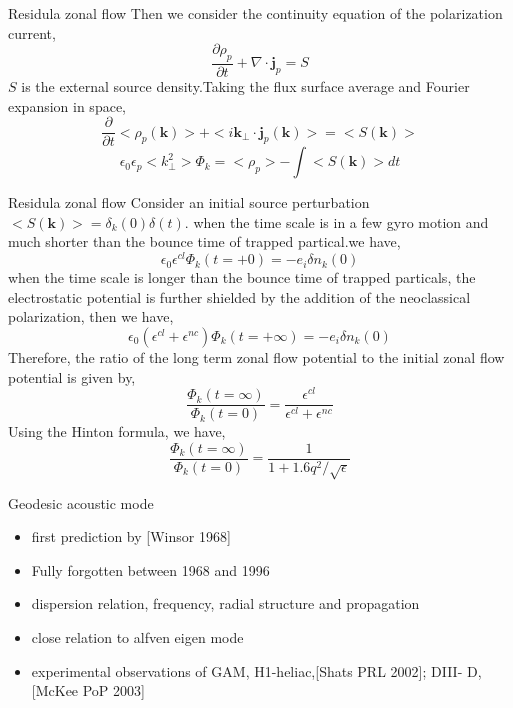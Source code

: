 \documentclass{beamer}
\begin{document}
\begin{frame}{Residula zonal flow}
Then we consider the continuity equation of the polarization current,
\begin{equation}
\frac{\partial\rho_p}{\partial{t}}+\nabla\cdot\pmb{j}_p=S		
\end{equation}
$S$ is the external source density.Taking the flux surface average and Fourier expansion in space, 
\begin{equation}
\frac{\partial}{\partial{t}}<\rho_p(\pmb{k})>+<i\pmb{k}_\perp\cdot{\pmb{j}_p}(\pmb{k})>=<S(\pmb{k})>
\end{equation}
\begin{equation}
\epsilon_0\epsilon_p<k_\perp^2>\Phi_k=<\rho_p>-\int<S(\pmb{k})>dt
\end{equation}
\end{frame}


\begin{frame}{Residula zonal flow}
Consider an initial source perturbation $<S(\pmb{k})>=\delta_k(0)\delta(t)$. when the time scale is in a few gyro motion and much shorter than the bounce time of trapped partical.we have,
\begin{equation}
\epsilon_0\epsilon^{cl}\Phi_k(t=+0)=-e_i\delta{n_k(0)}
\end{equation} 
when the time scale is longer than the bounce time of trapped particals, the electrostatic potential is further shielded by the addition of the neoclassical polarization, then we have,
\begin{equation}
\epsilon_0(\epsilon^{cl}+\epsilon^{nc})\Phi_k(t=+\infty)=-e_i\delta{n_k(0)}
\end{equation}
Therefore, the ratio of the long term zonal flow potential to the initial zonal flow potential is given by, 
\begin{equation}
\frac{\Phi_k(t=\infty)}{\Phi_k(t=0)}=\frac{\epsilon^{cl}}{\epsilon^{cl}+\epsilon^{nc}}
\end{equation}
Using the Hinton formula, we have,
\begin{equation}
\frac{\Phi_k(t=\infty)}{\Phi_k(t=0)}=\frac{1}{1+1.6q^2/\sqrt{\epsilon}}
\end{equation}
\end{frame}


\begin{frame}{Geodesic acoustic mode}
\begin{itemize}
\item first prediction by [Winsor 1968]
\item Fully forgotten between 1968 and 1996
\item dispersion relation, frequency, radial structure and propagation
\item close relation to alfven eigen mode
\item experimental observations of GAM, H1-heliac,[Shats PRL 2002]; DIII-
D, [McKee PoP 2003]
\end{itemize}
\end{frame}
\end{document}
